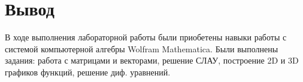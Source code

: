 \section*{Вывод}

В ходе выполнения лабораторной работы были приобетены навыки работы с
системой компьютерной алгебры Wolfram Mathematica.
Были выполнены задания: работа с матрицами и векторами, решение СЛАУ,
построение 2D и 3D графиков функций, решение диф.
уравнений.
